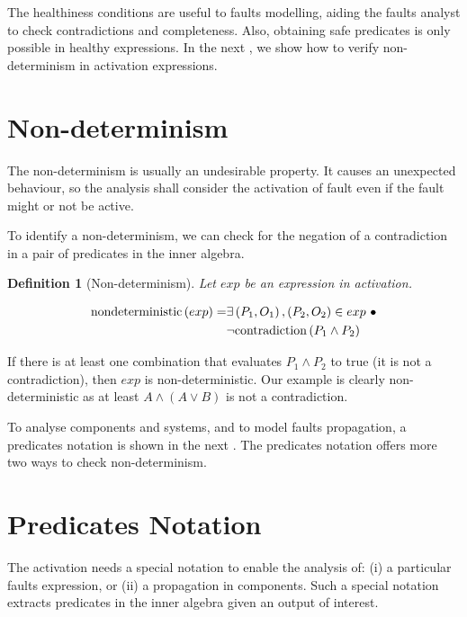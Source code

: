 \documentclass[12pt,openright,twoside,a4paper,oldfontcommands,english,brazil,final]{abntex2}
\newtheorem{definition}{Definition}[chapter]
\theoremstyle{theo}
\newcommand{\contradiction}[1]{\ensuremath\mathrm{contradiction}\left(#1\right)}
\def\nondetcmd{\ensuremath\mathrm{nondeterministic}}
\newcommand{\nondet}[1]{\nondetcmd\left(#1\right)}
\begin{document}
The healthiness conditions are useful to faults modelling, aiding the faults analyst to check contradictions and completeness.
Also, obtaining safe predicates is only possible in healthy expressions.
In the next , we show how to verify non-determinism in \ac{activation} expressions.


\section{Non-determinism}
\label{sec:non-determinism}

The non-determinism is usually an undesirable property.
It causes an unexpected behaviour, so the analysis shall consider the activation of fault even if the fault might or not be active.

To identify a non-determinism, we can check for the negation of a contradiction in a pair of predicates in the inner algebra.

\begin{definition}[Non-determinism]
\label{def:non-determinism}
Let $exp$ be an expression in \ac{activation}.

\begin{equation}
\label{eq:non-determinism}
\begin{split}
\nondet{exp} = & \exists \left(P_1,O_1\right),\left(P_2, O_2\right) \in exp~\bullet \\
  & \lnot \contradiction{P_1 \land P_2}
\end{split}
\end{equation}

\end{definition}

If there is at least one combination that evaluates $P_1 \land P_2$ to true (it is not a contradiction), then $exp$ is non-deterministic.
Our example is clearly non-deterministic as at least $A \land \left(A \lor B\right)$ is not a contradiction.

To analyse components and systems, and to model faults propagation, a predicates notation is shown in the next .
The predicates notation offers more two ways to check non-determinism.

\section{Predicates Notation}
\label{sec:predicates-notation}

The \ac{activation} needs a special notation to enable the analysis of: (i) a particular faults expression, or (ii) a propagation in components.
Such a special notation extracts predicates in the inner algebra given an output of interest.
\end{document}
